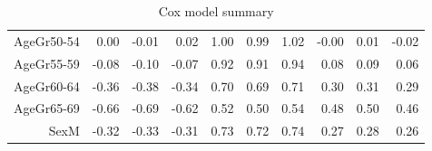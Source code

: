 \begin{table}[ht]
\begin{tabular}{rrrrrrrrrr}
  AgeGr50-54 & 0.00 & -0.01 & 0.02 & 1.00 & 0.99 & 1.02 & -0.00 & 0.01 & -0.02 \\ 
  AgeGr55-59 & -0.08 & -0.10 & -0.07 & 0.92 & 0.91 & 0.94 & 0.08 & 0.09 & 0.06 \\ 
  AgeGr60-64 & -0.36 & -0.38 & -0.34 & 0.70 & 0.69 & 0.71 & 0.30 & 0.31 & 0.29 \\ 
  AgeGr65-69 & -0.66 & -0.69 & -0.62 & 0.52 & 0.50 & 0.54 & 0.48 & 0.50 & 0.46 \\ 
  SexM & -0.32 & -0.33 & -0.31 & 0.73 & 0.72 & 0.74 & 0.27 & 0.28 & 0.26 \\ 
   \hline
\end{tabular}
\caption{Cox model summary} 
\end{table}
